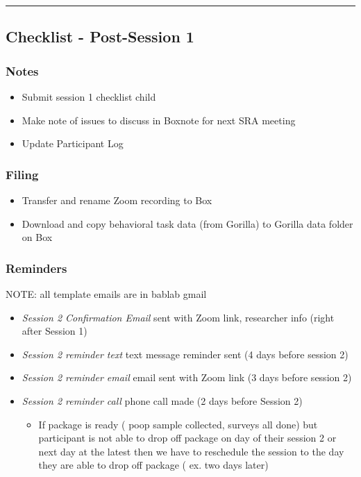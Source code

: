 \documentclass[]{book}
\providecommand{\tightlist}{%
  \setlength{\itemsep}{0pt}\setlength{\parskip}{0pt}}
\begin{document}
\begin{center}\rule{0.5\linewidth}{0.5pt}\end{center}

\hypertarget{checklist---post-session-1-1}{%
\subsection{Checklist - Post-Session 1}\label{checklist---post-session-1-1}}

\hypertarget{notes-2}{%
\subsubsection{Notes}\label{notes-2}}

\begin{itemize}
\tightlist
\item
  Submit session 1 checklist child
\item
  Make note of issues to discuss in Boxnote for next SRA meeting
\item
  Update Participant Log
\end{itemize}

\hypertarget{filing-5}{%
\subsubsection{Filing}\label{filing-5}}

\begin{itemize}
\tightlist
\item
  Transfer and rename Zoom recording to Box
\item
  Download and copy behavioral task data (from Gorilla) to Gorilla data folder on Box
\end{itemize}

\hypertarget{reminders-3}{%
\subsubsection{Reminders}\label{reminders-3}}

NOTE: all template emails are in bablab gmail

\begin{itemize}
\tightlist
\item
  \emph{Session 2 Confirmation Email} sent with Zoom link, researcher info (right after Session 1)
\item
  \emph{Session 2 reminder text} text message reminder sent (4 days before session 2)
\item
  \emph{Session 2 reminder email} email sent with Zoom link (3 days before session 2)
\item
  \emph{Session 2 reminder call} phone call made (2 days before Session 2)

  \begin{itemize}
  \tightlist
  \item
    If package is ready ( poop sample collected, surveys all done) but participant is not able to drop off package on day of their session 2 or next day at the latest then we have to reschedule the session to the day they are able to drop off package ( ex. two days later)
  \end{itemize}
\end{itemize}
\end{document}
